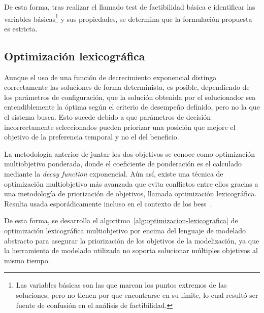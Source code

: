 De esta forma, tras realizar el llamado test de factibilidad básica e identificar las variables básicas\footnote{Las variables básicas son las que marcan los puntos extremos de las soluciones, pero no tienen por que encontrarse en su límite, lo cual resultó ser fuente de confusión en el análisis de factibilidad.} y sus propiedades, se determina que la formulación propuesta es estricta.

\subsection{Optimización lexicográfica}
\label{makereference5.3.1}

Aunque el uso de una función de decrecimiento exponencial distinga correctamente las soluciones de forma determinista, es posible, dependiendo de los parámetros de configuración, que la solución obtenida por el solucionador sea entendiblemente la óptima según el criterio de desempeño definido, pero no la que el sistema busca. Esto sucede debido a que parámetros de decisión incorrectamente seleccionados pueden priorizar una posición que mejore el objetivo de la preferencia temporal y no el del beneficio.

La metodología anterior de juntar los dos objetivos se conoce como optimización multiobjetivo ponderada, donde el coeficiente de ponderación es el calculado mediante la \textit{decay function} exponencial. Aún así, existe una técnica de optimización multiobjetivo más avanzada que evita conflictos entre ellos gracias a una metodología de priorización de objetivos, llamada optimización lexicográfica. Resulta usada esporádicamente incluso en el contexto de los \gls{bess}~\cite{karimi2019multi}.

De esta forma, se desarrolla el algoritmo~\ref{alg:optimizacion-lexicografica} de optimización lexicográfica multiobjetivo por encima del lenguaje de modelado abstracto para asegurar la priorización de los objetivos de la modelización, ya que la herramienta de modelado utilizada no soporta solucionar múltiples objetivos al mismo tiempo.

